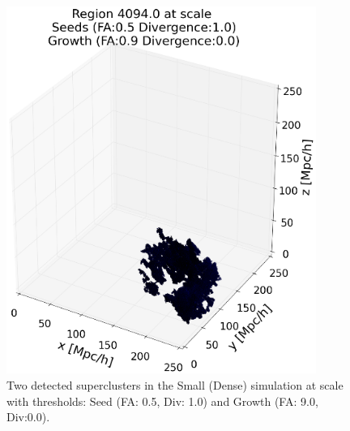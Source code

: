 \documentclass[12pt]{article}
\begin{document}
\begin{figure}[ht]
\begin{minipage}{.5\textwidth}
  \includegraphics[width=0.9\textwidth]{groups/3d/seeds_FA_5/region_4094_scale_seeds_FA_05_Trace_10_search_FA_09_Trace_00_.png}
\end{minipage}
\caption{Two detected superclusters in the Small (Dense) simulation at scale with thresholds: Seed (FA: 0.5, Div: 1.0) and Growth (FA: 9.0, Div:0.0). }
\label{fg:detected_scale_51_90}
\end{figure}
\FloatBarrier
\end{document}
